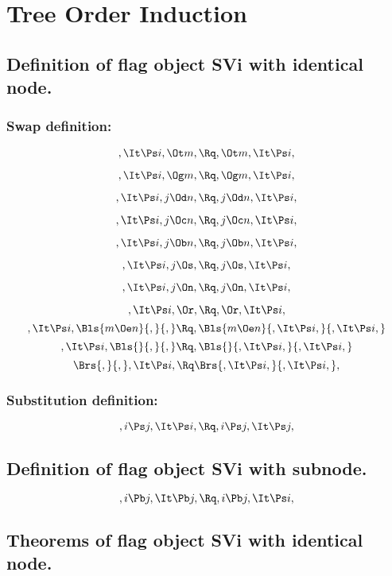 
\chapter{Tree Order Induction}
\section{Definition of flag object SVi with identical node.}



\subsection{Swap definition:}
\[,\It \Ps i, \Ot m, \Rq , \Ot m, \It \Ps i,\]

\[,\It \Ps i, \Og m, \Rq , \Og m, \It \Ps i,\]

\[,\It \Ps i, j \Od n, \Rq , j \Od n, \It \Ps i,\]

\[,\It \Ps i, j \Oc n, \Rq , j \Oc n, \It \Ps i,\]

\[,\It \Ps i, j \Ob n, \Rq , j \Ob n, \It \Ps i,\]

\[,\It \Ps i, j \Os, \Rq , j \Os, \It \Ps i,\]

\[,\It \Ps i, j \On, \Rq , j \On, \It \Ps i,\]

\[,\It \Ps i, \Or, \Rq , \Or, \It \Ps i,\]
\bigskip
\[,\It \Ps i, \Bls{m \Oe n}{,}{,} \Rq , \Bls{m \Oe n}{,\It \Ps i,}{,\It \Ps i,}\]
\bigskip
\[,\It \Ps i, \Bls{}{,}{,} \Rq , \Bls{}{,\It \Ps i,}{,\It \Ps i,}\]
\bigskip
\[ \Brs{,}{,},\It \Ps i, \Rq \Brs{,\It \Ps i,}{,\It \Ps i,},\]



\bigskip
\bigskip
\subsection{Substitution definition:}
\[,i \Ps j, \It \Ps i, \Rq , i\Ps j, \It \Ps j,\]



\bigskip
\bigskip
\bigskip
\bigskip
\section{Definition of flag object SVi with subnode.}
\[, i \Pb j, \It \Pb j, \Rq , i \Pb j, \It \Ps i,\]



\bigskip
\bigskip
\bigskip
\bigskip
\section{Theorems of flag object SVi with identical node.}

